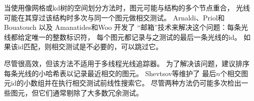 当使用像网格或kd树的空间划分方法时，图元可能与结构的多个节点重合，
光线可能在其穿过该结构时多次与同一个图元做相交测试。
Arnaldi、Priol和Bouatouch \parencite*{Arnaldi1987}以及
Amanatides和Woo \parencite*{10.2312:egtp.19871000}开发了
“邮箱”技术来解决这个问题：每条光线都给定唯一的整数标识符，
每个图元都记录与之测试的最后一条光线的id。
如果该id匹配，则相交测试是不必要的，可以跳过它。

尽管很高效，但该方法不适用于多线程光线追踪器。
为了解决该问题，\citet{Benthin_2006}建议排序
每条光线的小哈希表以记录最近相交的图元。
Shevtsov等\parencite*{shevtsov2007ray}维护了
最后$n$个相交图元id的小数组并在执行相交测试前线性搜索它。
尽管两种方法仍可能多次检出一些图元，但它们通常剔除了大多数冗余测试。